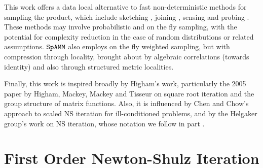 \documentclass[letterpaper,twocolumn,amsmath,amsfont,amssymb,english,aps,jcp,preprintnumbers,groupaddress,nofootinbib,tightenlines,floatfix]{revtex4}
\newcommand{\mat}[1]{\boldsymbol{#1}}
\newcommand{\ot}{  {\scriptstyle \otimes}_{ \tau } }
\theoremstyle{plain}
\theoremstyle{remark}
\theoremstyle{plain}
\begin{document}
This work offers a data local alternative to fast non-deterministic methods for sampling the product, 
which include sketching \cite{Sarlos2006,Drineas2006,Mahoney2012,Pagh2013,Woodruff2015},
joining \cite{Mishra92,Hoel94,Jacox03,Chen07,Amossen09,Lieberman08,Kim09}, 
sensing \cite{iwen2009note} and probing \cite{chiu2012matrix}.  These  methods may involve probabilistic 
and on the fly sampling, with the potential for complexity reduction in the case of random distributions or related assumptions. 
$\tt SpAMM$  also employs on the fly weighted sampling,  but with 
compression through locality, brought about by algebraic correlations (towards identity) and also through structured metric localities.



Finally, this work is inspired broadly by Higham's work, particularly the 2005 paper by 
Higham, Mackey, Mackey and Tisseur \cite{higham2005} on square root iteration and the group structure of matrix functions.
Also, it is influenced by Chen and Chow's \cite{chen2014} approach to scaled NS iteration for ill-conditioned problems, and by 
the Helgaker group's work on NS iteration, whose notation we follow in part \cite{Jansik2007}.  



\section{First Order Newton-Shulz Iteration}
\end{document}
